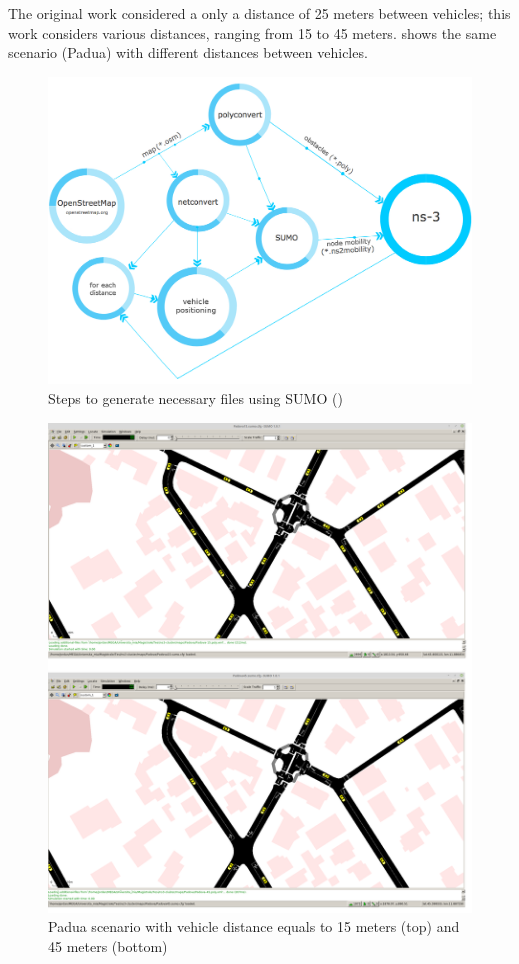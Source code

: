 		The original work considered a only a distance of 25 meters between vehicles; this work considers various distances, ranging from 15 to 45 meters.   shows the same scenario (Padua) with different distances between vehicles.
		
		\begin{figure}[H]
			\centering
			\includegraphics[width=\textwidth]{immagini/sumo-process}
			\caption{Steps to generate necessary files using SUMO (\cite{ROM2017})}
			\label{fig:sumo-process}
		\end{figure}
		
		\begin{figure}[H]
			\centering
			\includegraphics[width=\textwidth]{immagini/sumo-distances}
			\caption{Padua scenario with vehicle distance equals to 15 meters (top) and 45 meters (bottom)}
			\label{fig:sumo-distances}
		\end{figure}
